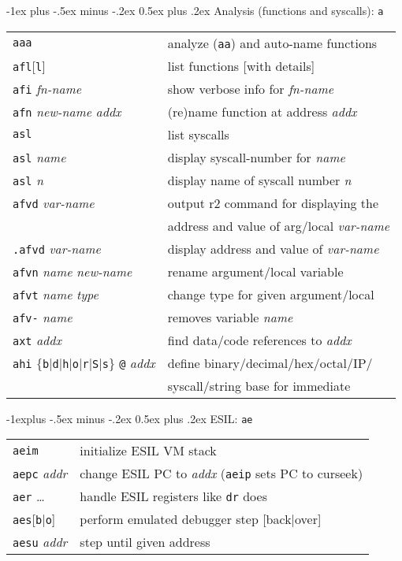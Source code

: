 \documentclass[a4paper,landscape]{article}
\makeatletter
\renewcommand{\section}{\@startsection{section}{1}{0mm}%
                                {-1ex plus -.5ex minus -.2ex}%
                                {0.5ex plus .2ex}%
                                {\normalfont\large\bfseries}}
\renewcommand{\subsection}{\@startsection{subsection}{2}{0mm}%
                                {-1explus -.5ex minus -.2ex}%
                                {0.5ex plus .2ex}%
                                {\normalfont\normalsize\bfseries}}
\makeatother
\begin{document}
\begin{multicols*}{3}
\section{Analysis (functions and syscalls): \texttt{a}}
\begin{tabular}{@{}ll@{}}
\texttt{aaa} & analyze (\texttt{aa}) and auto-name functions \\
\texttt{afl}[\texttt{l}] & list functions [with details] \\
\texttt{afi} \textit{fn-name} & show verbose info for \textit{fn-name} \\
\texttt{afn} \textit{new-name} \textit{addx} & (re)name function at address \textit{addx} \\
\texttt{asl} & list syscalls \\
\texttt{asl} \textit{name} & display syscall-number for \textit{name} \\
\texttt{asl} \textit{n} & display name of syscall number \textit{n} \\
\texttt{afvd} \textit{var-name} & output r2 command for displaying the \\ & address and value of arg/local \textit{var-name} \\
\texttt{.afvd} \textit{var-name} & display address and value of \textit{var-name} \\
\texttt{afvn} \textit{name} \textit{new-name} & rename argument/local variable \\
\texttt{afvt} \textit{name} \textit{type} & change type for given argument/local \\
\texttt{afv-} \textit{name} & removes variable \textit{name} \\
\texttt{axt} \textit{addx} & find data/code references to \textit{addx} \\
\texttt{ahi} $\{$\texttt{b}$|$\texttt{d}$|$\texttt{h}$|$\texttt{o}$|$\texttt{r}$|$\texttt{S}$|$\texttt{s}$\}$ \texttt{@} \textit{addx} & define binary/decimal/hex/octal/IP/ \\ & syscall/string base for immediate \\
\end{tabular}
\subsection{ESIL: \texttt{ae}}
\begin{tabular}{@{}ll@{}}
\texttt{aeim} & initialize ESIL VM stack \\
\texttt{aepc} \textit{addr} & change ESIL PC to \textit{addx} (\texttt{aeip} sets PC to curseek)\\
\texttt{aer} \dots & handle ESIL registers like \texttt{dr} does \\
\texttt{aes}[\texttt{b}|\texttt{o}] & perform emulated debugger step [back|over] \\
\texttt{aesu} \textit{addr} & step until given address \\
\end{tabular}

\end{multicols*}
\end{document}
